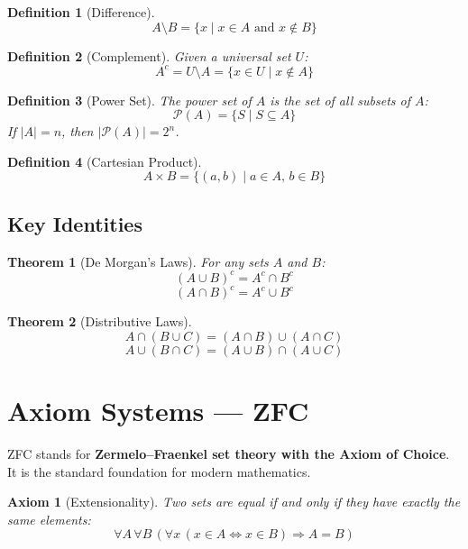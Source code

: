 \documentclass[12pt, a4paper]{article}
\newtheorem{definition}{Definition}[section]
\newtheorem{theorem}{Theorem}[section]
\newtheorem{axiom}{Axiom}[section]
\begin{document}
\begin{definition}[Difference]
$$A \setminus B = \{ x \mid x \in A \text{ and } x \notin B \}$$
\end{definition}

\begin{definition}[Complement]
Given a universal set $U$:
$$A^c = U \setminus A = \{ x \in U \mid x \notin A \}$$
\end{definition}

\begin{definition}[Power Set]
The power set of $A$ is the set of all subsets of $A$:
$$\mathcal{P}(A) = \{ S \mid S \subseteq A \}$$
If $|A| = n$, then $|\mathcal{P}(A)| = 2^n$.
\end{definition}

\begin{definition}[Cartesian Product]
$$A \times B = \{ (a, b) \mid a \in A, \, b \in B \}$$
\end{definition}

\subsection{Key Identities}

\begin{theorem}[De Morgan's Laws]
For any sets $A$ and $B$:
$$(A \cup B)^c = A^c \cap B^c$$
$$(A \cap B)^c = A^c \cup B^c$$
\end{theorem}

\begin{theorem}[Distributive Laws]
$$A \cap (B \cup C) = (A \cap B) \cup (A \cap C)$$
$$A \cup (B \cap C) = (A \cup B) \cap (A \cup C)$$
\end{theorem}

\section{Axiom Systems — ZFC}

ZFC stands for \textbf{Zermelo--Fraenkel set theory with the Axiom of Choice}.
It is the standard foundation for modern mathematics.

\begin{axiom}[Extensionality]
Two sets are equal if and only if they have exactly the same elements:
$$\forall A \, \forall B \, (\forall x \, (x \in A \iff x \in B) \Rightarrow A = B)$$
\end{axiom}
\end{document}
